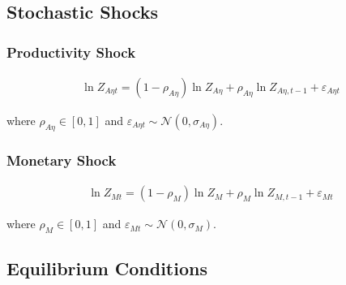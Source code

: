 \documentclass[
	12pt,
	]{article}
\numberwithin{equation}{section}
\theoremstyle{definition}
\theoremstyle{plain}
\theoremstyle{plain}
\theoremstyle{plain}
\begin{document}
\subsection{Stochastic Shocks}\label{sec:stochastic-shocks}

\subsubsection*{Productivity Shock} \label{sec:productivity shock}

\begin{align}
	\ln{Z_{A\eta t}} = (1-\rho_{A\eta})\ln{Z_{A\eta}} + \rho_{A\eta} \ln{Z_{A\eta,t-1}} + \varepsilon_{A\eta t} \label{eq:productivity-shock}
\end{align}

where $\rho_{A\eta} \in [0,1]$ and $\varepsilon_{A\eta t} \sim \mathscr{N}(0,\sigma_{A\eta})$.

\subsubsection*{Monetary Shock} \label{sec:monetary shock}

\begin{align}
	\ln{Z_{Mt}} = (1-\rho_M)\ln{Z_{M}} + \rho_M\ln{Z_{M,t-1}} + \varepsilon_{Mt} \label{eq:monetary-shock}
\end{align}

where $\rho_M \in [0,1]$ and $\varepsilon_{Mt} \sim \mathscr{N}(0,\sigma_M)$.


\subsection{Equilibrium Conditions}

\end{document}
